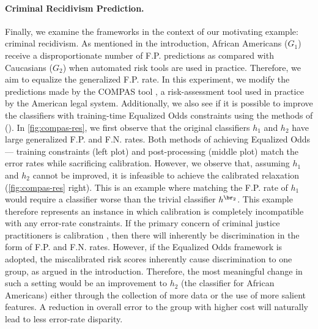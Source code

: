 \paragraph{Criminal Recidivism Prediction.}
  Finally, we examine the frameworks in the context of our motivating example: criminal recidivism.
  As mentioned in the introduction, African Americans ($G_1$) receive a disproportionate
  number of F.P. predictions as compared with Caucasians ($G_2$) when automated risk
  tools are used in practice.
  Therefore, we aim to equalize the generalized F.P. rate.
  In this experiment, we modify the predictions made by the COMPAS
  tool \cite{dieterich-northpointe-fairness}, a risk-assessment tool used in practice by the
  American legal system.
  Additionally, we also see if it is possible to improve the classifiers with training-time
  Equalized Odds constraints using the methods of \citet{zafar2017fairness} (\zafaretal{}).
  In \autoref{fig:compas-res}, we first observe that the original classifiers $h_1$ and $h_2$
  have large generalized F.P. and F.N. rates. Both methods of achieving
  Equalized Odds --- training constraints (left plot) and post-processing (middle plot)
  match the error rates while sacrificing calibration.
  However, we observe that, assuming $h_1$ and $h_2$ cannot be improved, it is
  infeasible to achieve the calibrated relaxation (\autoref{fig:compas-res} right).
  This is an example where matching the F.P. rate of $h_1$ would require
  a classifier worse than the trivial classifier $h^{\br_2}$.
  This example therefore represents an instance in which calibration is completely
  incompatible with any error-rate constraints.
  If the primary concern of criminal justice practitioners is calibration
  \cite{dieterich-northpointe-fairness,flores-re-propublica-fair}, then there
  will inherently be discrimination in the form of F.P. and F.N. rates.
  However, if the Equalized Odds framework is adopted, the miscalibrated risk
  scores inherently cause discrimination to one group, as argued in the introduction.
  Therefore, the most meaningful change in such a setting
  would be an improvement to $h_2$ (the classifier for African Americans)
  either through the collection of more data or the use of more salient features.
  A reduction in overall error to the
  group with higher cost will naturally lead to less error-rate disparity.



